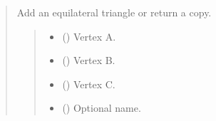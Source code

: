 \documentclass[letterpaper,10pt,english]{sphinxmanual}
\begin{document}
\begin{quote}
\begin{fulllineitems}
\begin{fulllineitems}
\begin{quote}
\begin{description}
\end{description}\end{quote}

\end{fulllineitems}


\begin{fulllineitems}
\label{\detokenize{pygeox:pygeox.add_objects.AddNamespace.equilateral_triangle}}
\pysigstartsignatures
\pysiglinewithargsret
{}
{\sphinxparamcomma {}\sphinxparamcomma {}\sphinxparamcomma {}\sphinxparamcomma {}}
{}
\pysigstopsignatures
\sphinxAtStartPar
Add an equilateral triangle or return a copy.
\begin{quote}\begin{description}
\begin{itemize}
\item {} 
\sphinxAtStartPar
{} (\sphinxstyleliteralemphasis{\sphinxupquote{ | }}) \textendash{} Vertex A.

\item {} 
\sphinxAtStartPar
{} (\sphinxstyleliteralemphasis{\sphinxupquote{ | }}) \textendash{} Vertex B.

\item {} 
\sphinxAtStartPar
{} (\sphinxstyleliteralemphasis{\sphinxupquote{ | }}) \textendash{} Vertex C.

\item {} 
\sphinxAtStartPar
{} (\sphinxstyleliteralemphasis{\sphinxupquote{ | }}) \textendash{} Optional name.


\end{itemize}
\end{description}
\end{quote}
\end{fulllineitems}
\end{fulllineitems}
\end{quote}
\end{document}
